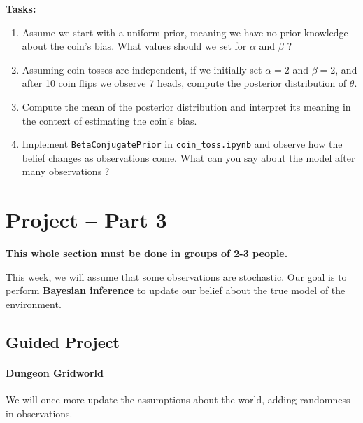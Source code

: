 \documentclass[11pt]{article}
\numberwithin{equation}{section}
\newcommand{\sol}[1]{
    }
\begin{document}
\textbf{Tasks:}
\begin{enumerate}
\item Assume we start with a uniform prior, meaning we have no prior knowledge about the coin's bias. What values should we set for $\alpha$ and $\beta$ ?

\sol{
    Since we have no prior knowledge, we should initialise our belief with parameters that do not favor tail or head probabilities: $\alpha = \beta$.
}

\item Assuming coin tosses are independent, if we initially set \( \alpha = 2 \) and \( \beta = 2 \), and after 10 coin flips we observe 7 heads, compute the posterior distribution of \( \theta \).

\sol{
    Denoting $D$ the 10 observed tosses, we have $\theta | D \sim \text{Beta}(9, 5)$. 
}

\item Compute the mean of the posterior distribution and interpret its meaning in the context of estimating the coin's bias.

\sol{
    The mean of the posterior is as follows: $E[\theta | D] = \dfrac{9}{9 + 5} \approx 0.643$.
     Under this posterior belief, we believe that the coin is slightly biased, such that we expect to get heads 64.3\% of the time.
}
\item Implement \texttt{BetaConjugatePrior} in \texttt{coin\_toss.ipynb} and observe how the belief changes as observations come. What can you say about the model after many observations ?
\end{enumerate}


\section*{\textbf{Project -- Part 3}}

\textbf{This whole section must be done in groups of \underline{2-3 people}.}
\smallskip

This week, we will assume that some observations are stochastic. Our goal is to perform \textbf{Bayesian inference} to update our belief about the true model of the environment.

\subsection{Guided Project}

\paragraph{Dungeon Gridworld} We will once more update the assumptions about the world, adding randomness in observations.
\end{document}
